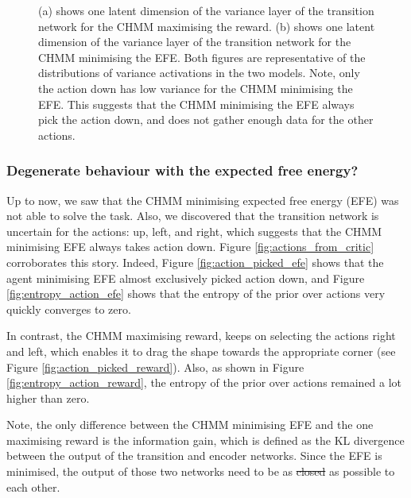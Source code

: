 \documentclass[twoside,11pt]{article}
\providecommand{\DIFadd}[1]{{\protect\color{blue}\uwave{#1}}} %
\providecommand{\DIFdel}[1]{{\protect\color{red}\sout{#1}}}                      %
\providecommand{\DIFaddbegin}{} %
\providecommand{\DIFaddend}{} %
\providecommand{\DIFdelbegin}{} %
\providecommand{\DIFdelend}{} %
\begin{document}
\begin{figure}[ht!]
    \caption{(a) shows one latent dimension of the variance layer of the transition network for the CHMM maximising the reward.
             (b) shows one latent dimension of the variance layer of the transition network for the CHMM minimising the EFE.
             Both figures are representative of the distributions of variance activations in the two models.
             Note, only the action down has low variance for the CHMM minimising the EFE.
             This suggests that the CHMM minimising the EFE always pick the action down, and does not gather enough data for the other actions.
    }
    \label{fig:cka-chmm-trans-sa}
\end{figure}

\subsubsection{Degenerate behaviour with the expected free energy?}

Up to now, we saw that the CHMM minimising expected free energy (EFE) was not able to solve the task. Also, we discovered that the transition network is uncertain for the actions: up, left, and right, which suggests that the CHMM minimising EFE always takes action down. Figure \ref{fig:actions_from_critic} corroborates this story. Indeed, Figure \ref{fig:action_picked_efe} shows that the agent minimising EFE almost exclusively picked action down, and Figure \ref{fig:entropy_action_efe} shows that the entropy of the prior over actions very quickly converges to zero.

In contrast, the CHMM maximising reward, keeps on selecting the actions right and left, which enables it to drag the shape towards the appropriate corner (see Figure \ref{fig:action_picked_reward}). Also, as shown in Figure \ref{fig:entropy_action_reward}, the entropy of the prior over actions remained a lot higher than zero. \DIFdelbegin %

\DIFdelend Note, the only difference between the CHMM minimising EFE and the one maximising reward is the information gain, which is defined as the KL divergence between the output of the transition and encoder networks. Since the EFE is minimised, the output of those two networks need to be as \DIFdelbegin \DIFdel{closed }\DIFdelend \DIFaddbegin \DIFadd{close }\DIFaddend as possible to each other.
\end{document}
